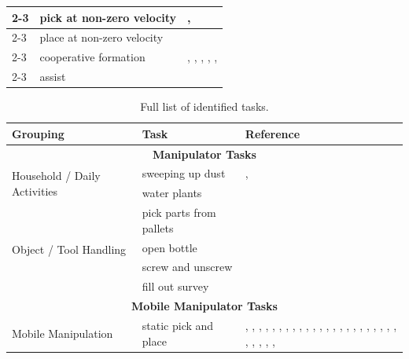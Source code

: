 \begin{table}[p]
\begin{tabular}{|p{4cm}|p{5cm}|p{15cm}|}
\cline{2-3}
    & pick at non-zero velocity                & \cite{Zhao2025ACL}, \cite{Yang2023LearnTC} \\
\cline{2-3}
    & place at non-zero velocity               & \cite{Zhao2025ACL} \\
\cline{2-3}
    & cooperative formation                    & \cite{Sayyaadi2014ControlON}, \cite{Chang2006ABB}, \cite{Chang2006AnalysisOA}, \cite{Pimentel2002OnTD}, \cite{Kim2022LearningAG}, \cite{Wahba2025pcdbCBSKM} \\
\cline{2-3}
    & assist                                   & \cite{Ding2022IntelligentAF} \\
\hline
\end{tabular}
\end{table}

\begin{table}[p]
\thispagestyle{empty}
\caption{Full list of identified tasks.}
\label{tab_tasks}
\centering
\begin{tabular}{|p{4cm}|p{5cm}|p{15cm}|}
\hline
\textbf{Grouping} & \textbf{Task} & \textbf{Reference} \\
\hline
\multicolumn{3}{|c|}{\textbf{Manipulator Tasks}} \\
\hline
\multirow{2}{*}{\parbox{4cm}{Household / Daily Activities}}
    &  sweeping up dust       & \cite{Stckler2014AdaptiveTS}, \cite{Yamazaki2012HomeAssistantRF} \\
\cline{2-3}
    & water plants            & \cite{Stckler2014AdaptiveTS} \\
\hline
\multirow{4}{*}{\parbox{3cm}{Object / Tool Handling}}
    & pick parts from pallets & \cite{Holz2015ASS} \\
\cline{2-3}
    & open bottle             & \cite{Stckler2013IncreasingFO} \\
\cline{2-3}
    & screw and unscrew       & \cite{Koch2017ASR} \\
\cline{2-3}
    & fill out survey         & \cite{Niekum2012LearningAG} \\
\hline
\multicolumn{3}{|c|}{\textbf{Mobile Manipulator Tasks}} \\
\hline
\multirow{4}{*}{\parbox{3cm}{Mobile Manipulation}}
    & static pick and place                                          & \cite{Forster2020AutomaticEO}, \cite{Tsay2018BehavioristicIP}, \cite{Laaksonen2010EmbodimentIM}, \cite{Garrett2016FFRobLS}, \cite{Pedersen2015GestureBasedEO}, \cite{Stckler2013IncreasingFO}, \cite{Stckler2009IntegratingIM}, \cite{Niekum2012LearningAG}, \cite{Stulp2009LearningAP}, \cite{Pohl2024MAkEableMA}, \cite{Beetz2016OpenRR}, \cite{Li2020PatternAA}, \cite{Partovi2017ReactiveIM}, \cite{Vasilopoulos2020ReactivePF}, \cite{Zhao2025ReactiveWL}, \cite{Short2019SAILSA}, \cite{Hentout2008MultiagentAM}, \cite{Kiyokawa2025SelfSupervisedLO}, \cite{Lim2019SkillbasedAA}, \cite{Amaral2017SkillbasedAA}, \cite{Klamt2018SupervisedAL}, \cite{Hentout2007BehaviourbasedAF}, \cite{Kotecha2024AHM}, \cite{Akkaladevi2024TowardsAB}, \cite{Zhao2020CooperativeMF}, \cite{Urbaniak2025ObstacleAU}, \cite{Carvalho2025ParameterFreeSO}, \cite{Fu2024MobileAL}, \cite{Mounsif2020BAMBA} \\

\end{tabular}
\end{table}
